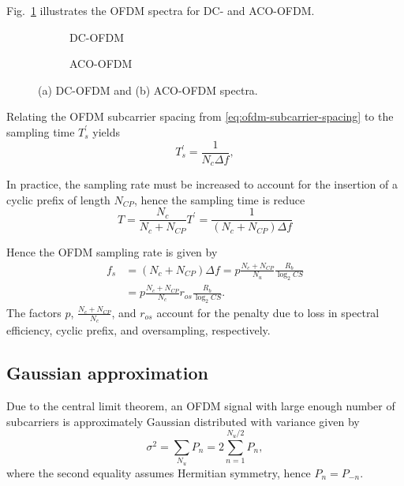 \documentclass[a4paper]{article}
\begin{document}
Fig.~\ref{fig:ofdm-spectra} illustrates the OFDM spectra for DC- and ACO-OFDM.

\FloatBarrier
\begin{figure}[h!]
	\centering
	\begin{subfigure}[h!]{\textwidth}
		\centering
		\resizebox{\linewidth}{!}{}
		\caption{DC-OFDM}
	\end{subfigure}%
	
	\begin{subfigure}[h!]{\textwidth}
		\centering
		\resizebox{\linewidth}{!}{}
		\caption{ACO-OFDM}
	\end{subfigure}
	\caption{(a) DC-OFDM and (b) ACO-OFDM spectra.} \label{fig:ofdm-spectra}
\end{figure}
\FloatBarrier

Relating the OFDM subcarrier spacing from \eqref{eq:ofdm-subcarrier-spacing} to the sampling time $T_s^{\prime}$ yields
\begin{equation}
T_s^{\prime} = \frac{1}{N_c\Delta f},
\end{equation}

In practice, the sampling rate must be increased to account for the insertion of a cyclic prefix of length $N_{CP}$, hence the sampling time is reduce
\begin{equation}
T = \frac{N_c}{N_c + N_{CP}}T^{\prime} = \frac{1}{(N_c + N_{CP})\Delta f}
\end{equation}

Hence the OFDM sampling rate is given by
\begin{align} \nonumber
f_s &= (N_c + N_{CP})\Delta f = p\frac{N_c + N_{CP}}{N_u}\frac{R_b}{\log_2 CS} \\
&= p\frac{N_c + N_{CP}}{N_c}r_{os}\frac{R_b}{\log_2 CS}.
\end{align}
The factors $p$, $\frac{N_c + N_{CP}}{N_c}$, and $r_{os}$ account for the penalty due to loss in spectral efficiency, cyclic prefix, and oversampling, respectively. 

\subsection{Gaussian approximation}

Due to the central limit theorem, an OFDM signal with large enough number of subcarriers is approximately Gaussian distributed with variance given by
\begin{equation}
\sigma^2 = \sum_{N_u} P_n = 2\sum_{n=1}^{N_u/2} P_n,
\end{equation}
where the second equality assumes Hermitian symmetry, hence $P_n = P_{-n}$. 
\end{document}
